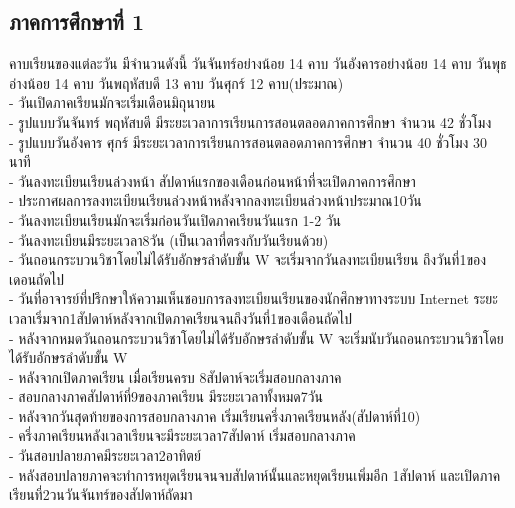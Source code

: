 \subsection{ภาคการศึกษาที่ 1}
  คาบเรียนของแต่ละวัน มีจำนวนดังนี้ วันจันทร์อย่างน้อย 14 คาบ วันอังคารอย่างน้อย 14 คาบ วันพุธอ่างน้อย 14 คาบ วันพฤหัสบดี 13 คาบ วันศุกร์ 12 คาบ(ประมาณ) \\
  - วันเปิดภาคเรียนมักจะเริ่มเดือนมิถุนายน \\
  - รูปแบบวันจันทร์ พฤหัสบดี มีระยะเวลาการเรียนการสอนตลอดภาคการศึกษา จำนวน 42 ชั่วโมง \\
  - รูปแบบวันอังคาร ศุกร์ มีระยะเวลาการเรียนการสอนตลอดภาคการศึกษา จำนวน 40 ชั่วโมง 30 นาที \\
  - วันลงทะเบียนเรียนล่วงหน้า สัปดาห์แรกของเดือนก่อนหน้าที่จะเปิดภาคการศึกษา \\
  - ประกาศผลการลงทะเบียนเรียนล่วงหน้าหลังจากลงทะเบียนล่วงหน้าประมาณ10วัน \\
  - วันลงทะเบียนเรียนมักจะเริ่มก่อนวันเปิดภาคเรียนวันแรก 1-2 วัน \\
  - วันลงทะเบียนมีระยะเวลา8วัน (เป็นเวลาที่ตรงกับวันเรียนด้วย) \\
  - วันถอนกระบวนวิชาโดยไม่ได้รับอักษรลำดับขั้น W จะเริ่มจากวันลงทะเบียนเรียน ถึงวันที่1ของเดอนถัดไป \\
  - วันที่อาจารย์ที่ปรึกษาให้ความเห็นชอบการลงทะเบียนเรียนของนักศึกษาทางระบบ Internet ระยะเวลาเริ่มจาก1สัปดาห์หลังจากเปิดภาคเรียนจนถึงวันที่1ของเดือนถัดไป \\
  - หลังจากหมดวันถอนกระบวนวิชาโดยไม่ได้รับอักษรลำดับขั้น W จะเริ่มนับวันถอนกระบวนวิชาโดยได้รับอักษรลำดับขั้น W \\
  - หลังจากเปิดภาคเรียน เมื่อเรียนครบ 8สัปดาห์จะเริ่มสอบกลางภาค \\
  - สอบกลางภาคสัปดาห์ที่9ของภาคเรียน มีระยะเวลาทั้งหมด7วัน \\
  - หลังจากวันสุดท้ายของการสอบกลางภาค เริ่มเรียนครึ่งภาคเรียนหลัง(สัปดาห์ที่10) \\
  - ครึ่งภาคเรียนหลังเวลาเรียนจะมีระยะเวลา7สัปดาห์ เริ่มสอบกลางภาค \\
  - วันสอบปลายภาคมีระยะเวลา2อาทิตย์ \\
  - หลังสอบปลายภาคจะทำการหยุดเรียนจนจบสัปดาห์นั้นและหยุดเรียนเพิ่มอีก 1สัปดาห์ และเปิดภาคเรียนที่2วนวันจันทร์ของสัปดาห์ถัดมา \\
